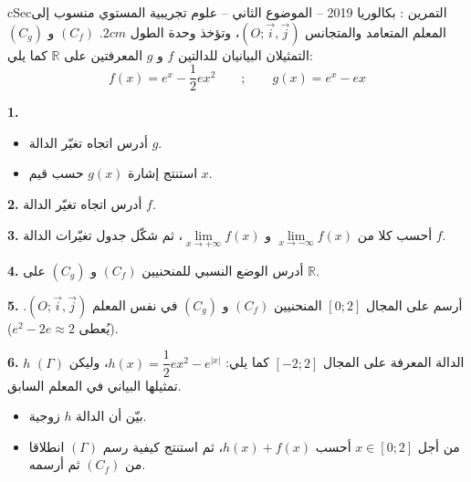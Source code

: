 \documentclass[12pt,a4paper]{article}
\newenvironment{BOX}[2]{\begin{otherlanguage}{english}\begin{arbox}{#1}{#2}}{\end{arbox}\end{otherlanguage}}
\newcounter{exo}
\newenvironment{tamrin}[1]{\stepcounter{exo}\begin{BOX}{cSec}{التمرين \theexo: #1}}{\end{BOX}}
\newcommand{\R}{\mathbb{R}}
\newenvironment{sq}{\begin{itemize}[leftmargin=2.4em,itemsep=3pt]}{\end{itemize}}
\newcommand{\qa}{\item[(أ)]}\newcommand{\qb}{\item[(ب)]}\newcommand{\qc}{\item[(جـ)]}\newcommand{\qd}{\item[(د)]}\newcommand{\qe}{\item[(هـ)]}
\newcommand{\QQ}[1]{\par\smallskip\textbf{#1.} }
\begin{document}
\begin{tamrin}{بكالوريا 2019 -- الموضوع الثاني -- علوم تجريبية}
المستوي منسوب إلى المعلم المتعامد والمتجانس $(O;\vec i,\vec j)$، وتؤخذ وحدة الطول $2cm$.
$(C_f)$ و $(C_g)$ التمثيلان البيانيان للدالتين $f$ و $g$ المعرفتين على $\R$ كما يلي:
\[f(x)=e^{x}-\frac12ex^{2}\qquad;\qquad g(x)=e^{x}-ex\]
\QQ{1}
\begin{sq}
\qa أدرس اتجاه تغيّر الدالة $g$.
\qb استنتج إشارة $g(x)$ حسب قيم $x$.
\end{sq}
\QQ{2} أدرس اتجاه تغيّر الدالة $f$.
\QQ{3} أحسب كلا من $\lim\limits_{x\to-\infty}f(x)$ و $\lim\limits_{x\to+\infty}f(x)$، ثم شكّل جدول تغيّرات الدالة $f$.
\QQ{4} أدرس الوضع النسبي للمنحنيين $(C_f)$ و $(C_g)$ على $\R$.
\QQ{5} أرسم على المجال $[0;2]$ المنحنيين $(C_f)$ و $(C_g)$ في نفس المعلم $(O;\vec i,\vec j)$. (يُعطى $e^{2}-2e\approx2$).
\QQ{6} $h$ الدالة المعرفة على المجال $[-2;2]$ كما يلي: $h(x)=\dfrac12ex^{2}-e^{|x|}$، وليكن $(\Gamma)$ تمثيلها البياني في المعلم السابق.
\begin{sq}
\qa بيّن أن الدالة $h$ زوجية.
\qb من أجل $x\in[0;2]$ أحسب $h(x)+f(x)$، ثم استنتج كيفية رسم $(\Gamma)$ انطلاقا من $(C_f)$ ثم أرسمه.
\end{sq}
\end{tamrin}
\end{document}
